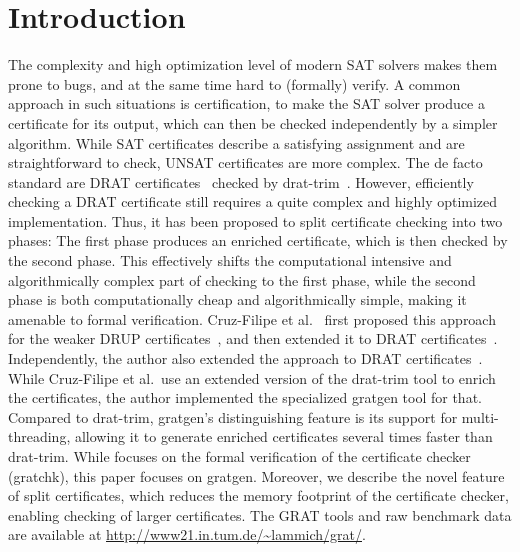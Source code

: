 \documentclass{llncs}
\begin{document}
\section{Introduction}
The complexity and high optimization level of modern SAT solvers makes them prone to bugs, and at the same time hard to (formally) verify.
A common approach in such situations is certification, \ie to make the SAT solver produce a certificate for its output, which can then be checked 
independently by a simpler algorithm. While SAT certificates describe a satisfying assignment and are straightforward to check, UNSAT certificates are 
more complex. The de facto standard are DRAT certificates~\cite{WHH14} checked by drat-trim~\cite{drat-trim-webpage}. 
However, efficiently checking a DRAT certificate still requires a quite complex and highly optimized implementation. 
Thus, it has been proposed to split certificate checking into two phases: The first phase produces an enriched certificate, which is then checked by the second phase.
This effectively shifts the computational intensive and algorithmically complex part of checking to the first phase, while the second phase is both computationally cheap 
and algorithmically simple, making it amenable to formal verification. Cruz-Filipe et al.~\cite{CMS17} first proposed this approach for the weaker DRUP certificates~\cite{WHH13},
and then extended it to DRAT certificates~\cite{CHHKS17}. Independently, the author also extended the approach to DRAT certificates~\cite{La17_CADE}.
While Cruz-Filipe et al.\ use an extended version of the drat-trim tool to enrich the certificates, the author implemented the specialized gratgen tool for that.
Compared to drat-trim, gratgen's distinguishing feature is its support for multi-threading, allowing it to generate enriched certificates several times faster
than drat-trim. While \cite{La17_CADE} focuses on the formal verification of the certificate checker (gratchk), this paper focuses on gratgen. 
Moreover, we describe the novel feature of split certificates, which reduces the memory footprint of the certificate checker, enabling checking of larger certificates.
The GRAT tools and raw benchmark data are available at \url{http://www21.in.tum.de/~lammich/grat/}.
\end{document}
